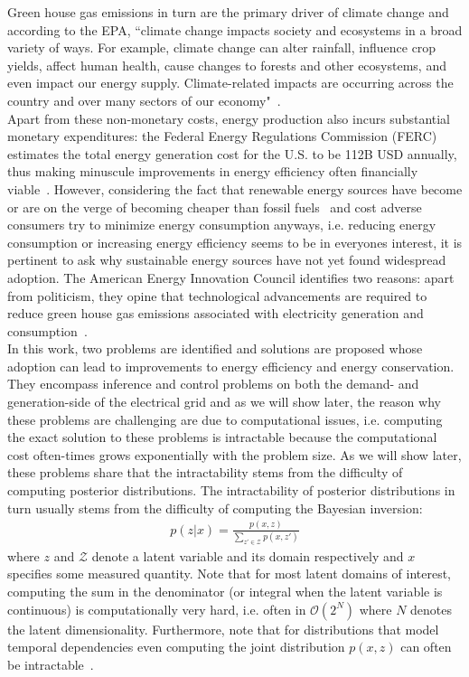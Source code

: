 \documentclass[11pt]{cmuthesis} %
\begin{document}
Green house gas emissions in turn are the primary driver of climate change and according to the EPA, ``climate change impacts society and ecosystems in a broad variety of ways. For example, climate change can alter rainfall, influence crop yields, affect human health, cause changes to forests and other ecosystems, and even impact our energy supply. Climate-related impacts are occurring across the country and over many sectors of our economy"~\cite{EPA}.\\
Apart from these non-monetary costs, energy production also incurs substantial monetary expenditures: the Federal Energy Regulations Commission (FERC) estimates the total energy generation cost for the U.S. to be 112B USD annually, thus making minuscule improvements in energy efficiency often financially viable~\cite{ferc2012history}. However, considering the fact that renewable energy sources have become or are on the verge of becoming cheaper than fossil fuels~\cite{eia2016} and cost adverse consumers try to minimize energy consumption anyways, i.e. reducing energy consumption or increasing energy efficiency seems to be in everyones interest, it is pertinent to ask why sustainable energy sources have not yet found widespread adoption. The American Energy Innovation Council identifies two reasons: apart from politicism, they opine that technological advancements are required to reduce green house gas emissions associated with electricity generation and consumption~\cite{AEIC}.\\
In this work, two problems are identified and solutions are proposed whose adoption can lead to improvements to energy efficiency and energy conservation. They encompass inference and control problems on both the demand- and generation-side of the electrical grid and as we will show later, the reason why these problems are challenging are due to computational issues, i.e. computing the exact solution to these problems is intractable because the computational cost often-times grows exponentially with the problem size. As we will show later, these problems share that the intractability stems from the difficulty of computing posterior distributions. The intractability of posterior distributions in turn usually stems from the difficulty of computing the Bayesian inversion:
\begin{align*}
p(z|x) = \frac{p(x,z)}{\sum_{z' \in \mathcal{Z}} p(x,z')}
\end{align*}
 where $z$ and $\mathcal{Z}$ denote a latent variable and its domain respectively and $x$ specifies some measured quantity. Note that for most latent domains of interest, computing the sum in the denominator (or integral when the latent variable is continuous) is computationally very hard, i.e. often in $\mathcal{O}(2^N)$ where $N$ denotes the latent dimensionality. Furthermore, note that for distributions that model temporal dependencies even computing the joint distribution $p(x,z)$ can often be intractable~\cite{ghahramani1996factorial}.\\
 
\end{document}
